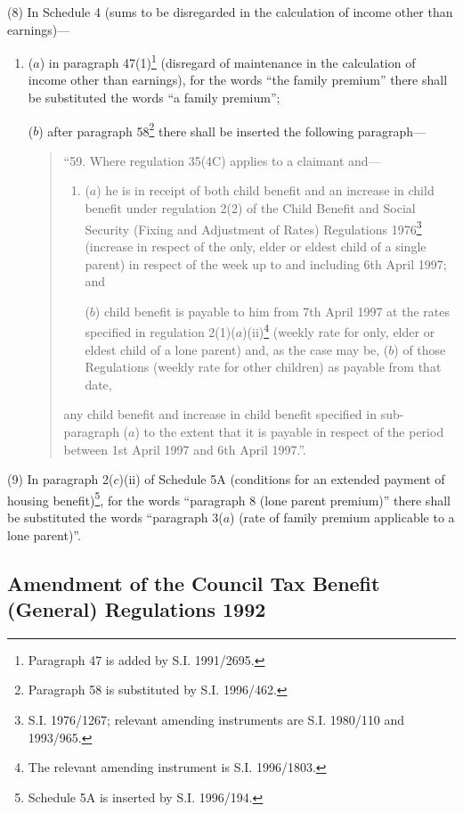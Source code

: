 \documentclass[a4paper]{article}
\begin{document}
(8) In Schedule 4 (sums to be disregarded in the calculation of income other than earnings)—
\begin{enumerate}\item[]
($a$) in paragraph 47(1)\footnote{\frenchspacing Paragraph 47 is added by S.I. 1991/2695.} (disregard of maintenance in the calculation of income other than earnings), for the words “the family premium” there shall be substituted the words “a family premium”;

($b$) after paragraph 58\footnote{\frenchspacing Paragraph 58 is substituted by S.I. 1996/462.} there shall be inserted the following paragraph—
\begin{quotation}
“59.  Where regulation 35(4C) applies to a claimant and—
\begin{enumerate}\item[]
($a$) he is in receipt of both child benefit and an increase in child benefit under regulation 2(2) of the Child Benefit and Social Security (Fixing and Adjustment of Rates) Regulations 1976\footnote{\frenchspacing S.I. 1976/1267; relevant amending instruments are S.I. 1980/110 and 1993/965.} (increase in respect of the only, elder or eldest child of a single parent) in respect of the week up to and including 6th April 1997; and

($b$) child benefit is payable to him from 7th April 1997 at the rates specified in regulation 2(1)($a$)(ii)\footnote{\frenchspacing The relevant amending instrument is S.I. 1996/1803.} (weekly rate for only, elder or eldest child of a lone parent) and, as the case may be, ($b$) of those Regulations (weekly rate for other children) as payable from that date,
\end{enumerate}
any child benefit and increase in child benefit specified in sub-paragraph ($a$) to the extent that it is payable in respect of the period between 1st April 1997 and 6th April 1997.”.
\end{quotation}
\end{enumerate}

(9) In paragraph 2($c$)(ii) of Schedule 5A (conditions for an extended payment of housing benefit)\footnote{\frenchspacing Schedule 5A is inserted by S.I. 1996/194.}, for the words “paragraph 8 (lone parent premium)” there shall be substituted the words “paragraph 3($a$) (rate of family premium applicable to a lone parent)”.

\subsection[8. Amendment of the Council Tax Benefit (General) Regulations 1992]{Amendment of the Council Tax Benefit (General) Regulations 1992}
\end{document}
